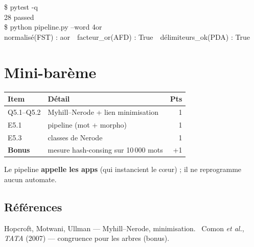 \documentclass[11pt,a4paper]{scrartcl}
\begin{document}
\begin{exemple}
\ttfamily \$ pytest -q\\ 28 passed\\[2pt]
\$ python pipeline.py --word 4or\\
\hspace*{2em}normalisé(FST) : aor\ \ facteur\_or(AFD) : True\ \ délimiteurs\_ok(PDA) : True
\end{exemple}

\section*{Mini-barème}
\begin{center}\small
\begin{tabular}{@{}llr@{}}
\toprule Item & Détail & Pts\\\midrule
Q5.1–Q5.2 & Myhill--Nerode + lien minimisation & 1\\
E5.1 & pipeline (mot + morpho) & 1\\
E5.3 & classes de Nerode & 1\\
\textbf{Bonus} & mesure hash-consing sur 10\,000 mots & +1\\
\bottomrule
\end{tabular}
\end{center}

\begin{gate}
Le pipeline \textbf{appelle les apps} (qui instancient le cœur) ; il ne reprogramme
aucun automate.
\end{gate}

\subsection*{Références}
Hopcroft, Motwani, Ullman — Myhill--Nerode, minimisation. \textbullet\ Comon \emph{et
al.}, \emph{TATA} (2007) — congruence pour les arbres (bonus).
\end{document}
